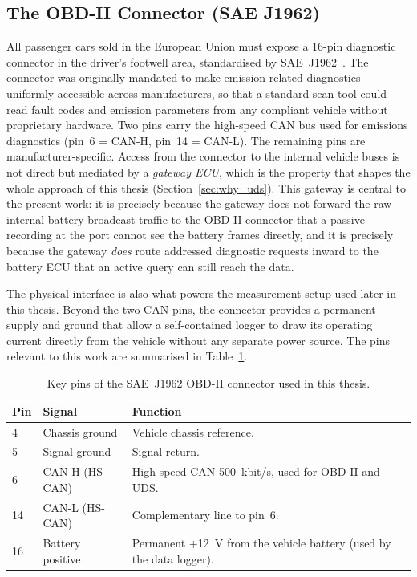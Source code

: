 \documentclass[11pt,a4paper,oneside,parskip=half]{scrreprt}
\begin{document}
\subsection{The OBD-II Connector (SAE J1962)}
\label{ssec:obd2}
All passenger cars sold in the European Union must expose a 16-pin diagnostic connector in the driver's footwell area, standardised by SAE~J1962~\cite{saej1962}. The connector was originally mandated to make emission-related diagnostics uniformly accessible across manufacturers, so that a standard scan tool could read fault codes and emission parameters from any compliant vehicle without proprietary hardware. Two pins carry the high-speed CAN bus used for emissions diagnostics (pin~6 = CAN-H, pin~14 = CAN-L). The remaining pins are manufacturer-specific. Access from the connector to the internal vehicle buses is not direct but mediated by a \textit{gateway ECU}, which is the property that shapes the whole approach of this thesis (Section~\ref{sec:why_uds}). This gateway is central to the present work: it is precisely because the gateway does not forward the raw internal battery broadcast traffic to the OBD-II connector that a passive recording at the port cannot see the battery frames directly, and it is precisely because the gateway \emph{does} route addressed diagnostic requests inward to the battery ECU that an active query can still reach the data.

The physical interface is also what powers the measurement setup used later in this thesis. Beyond the two CAN pins, the connector provides a permanent supply and ground that allow a self-contained logger to draw its operating current directly from the vehicle without any separate power source. The pins relevant to this work are summarised in Table~\ref{tab:obd2_pins}.

\begin{table}[H]
\caption{Key pins of the SAE~J1962 OBD-II connector used in this thesis.}
\label{tab:obd2_pins}
\centering
\begin{tabular}{llp{7cm}}
\toprule
\textbf{Pin} & \textbf{Signal} & \textbf{Function} \\
\midrule
4  & Chassis ground           & Vehicle chassis reference. \\
5  & Signal ground            & Signal return. \\
6  & CAN-H (HS-CAN)           & High-speed CAN 500~kbit/s, used for OBD-II and UDS. \\
14 & CAN-L (HS-CAN)           & Complementary line to pin~6. \\
16 & Battery positive         & Permanent +12~V from the vehicle battery (used by the data logger). \\
\bottomrule
\end{tabular}
\end{table}
\end{document}
